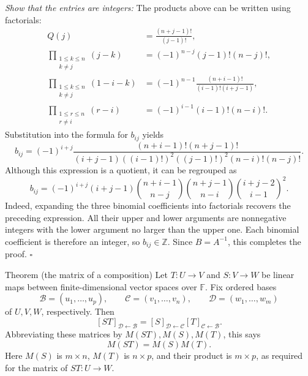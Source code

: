 \documentclass[a4paper,11pt,abstract=true]{scrartcl}
\theoremstyle{dotlessP}
\theoremstyle{dotlessS}
\theoremstyle{remark}
\theoremstyle{definition}
\begin{document}
\begin{claim_box}
\emph{Show that the entries are integers:} The products above
can be written using factorials:
\[
\begin{aligned}
Q(j)&=\frac{(n+j-1)!}{(j-1)!},\\
\prod_{\substack{1\leq k\leq n\\k\neq j}}(j-k)
&={(-1)}^{n-j}(j-1)!(n-j)!,\\
\prod_{\substack{1\leq k\leq n\\k\neq j}}(1-i-k)
&={(-1)}^{n-1}\frac{(n+i-1)!}{(i-1)!(i+j-1)},\\
\prod_{\substack{1\leq r\leq n\\r\neq i}}(r-i)
&={(-1)}^{i-1}(i-1)!(n-i)!.
\end{aligned}
\]
Substitution into the formula for $b_{ij}$ yields
\[
b_{ij}={(-1)}^{i+j}
\frac{(n+i-1)!(n+j-1)!}
{(i+j-1){((i-1)!)}^2{((j-1)!)}^2(n-i)!(n-j)!}.
\]
Although this expression is a quotient, it can be regrouped as
\[
\boxed{
b_{ij}={(-1)}^{i+j}(i+j-1)
\binom{n+i-1}{n-j}\binom{n+j-1}{n-i}
\binom{i+j-2}{i-1}^{\!2}.}
\]
Indeed, expanding the three binomial coefficients into factorials
recovers the preceding expression. All their upper and lower arguments
are nonnegative integers with the lower argument no larger than the
upper one. Each binomial coefficient is therefore an integer, so
$b_{ij}\in\mathbb{Z}$. Since $B=A^{-1}$, this completes the proof.
\hfill$\square$
\end{claim_box}

\begin{mainbox}{Theorem (the matrix of a composition)}
Let
$T:U\longrightarrow V$ and $S:V\longrightarrow W$ be linear maps
between finite-dimensional vector spaces over $\mathbb{F}$. Fix ordered
bases
\[
\mathcal{B}=(u_1,\ldots,u_p),\qquad
\mathcal{C}=(v_1,\ldots,v_n),\qquad
\mathcal{D}=(w_1,\ldots,w_m)
\]
of $U,V,W$, respectively. Then
\[
{[ST]}_{\mathcal{D}\leftarrow\mathcal{B}}
={[S]}_{\mathcal{D}\leftarrow\mathcal{C}}
{[T]}_{\mathcal{C}\leftarrow\mathcal{B}}.
\]
Abbreviating these matrices by $M(ST),M(S),M(T)$, this says
\[
M(ST)=M(S)M(T).
\]
Here $M(S)$ is $m\times n$, $M(T)$ is $n\times p$, and their product
is $m\times p$, as required for the matrix of $ST:U\longrightarrow W$.
\end{mainbox}
\end{document}
